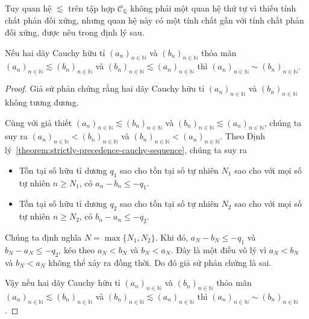 Tuy quan hệ $\lesssim$ trên tập hợp $\mathscr{C}_{\mathbb{Q}}$ không phải một quan hệ thứ tự vì thiếu tính chất phản đối xứng, nhưng quan hệ này có một tính chất gần với tính chất phản đối xứng, được nêu trong định lý sau.

\begin{theorem}\label{theorem:cauchy-sequences-pre-antisymmetric}
    Nếu hai dãy Cauchy hữu tỉ ${(a_{n})}_{n\in\mathbb{N}}$ và ${(b_{n})}_{n\in\mathbb{N}}$ thỏa mãn ${(a_{n})}_{n\in\mathbb{N}}\lesssim {(b_{n})}_{n\in\mathbb{N}}$ và ${(b_{n})}_{n\in\mathbb{N}}\lesssim {(a_{n})}_{n\in\mathbb{N}}$ thì ${(a_{n})}_{n\in\mathbb{N}}\sim {(b_{n})}_{n\in\mathbb{N}}$.
\end{theorem}

\begin{proof}
    Giả sử phản chứng rằng hai dãy Cauchy hữu tỉ ${(a_{n})}_{n\in\mathbb{N}}$ và ${(b_{n})}_{n\in\mathbb{N}}$ không tương đương.

    Cùng với giả thiết ${(a_{n})}_{n\in\mathbb{N}}\lesssim {(b_{n})}_{n\in\mathbb{N}}$ và ${(b_{n})}_{n\in\mathbb{N}}\lesssim {(a_{n})}_{n\in\mathbb{N}}$, chúng ta suy ra  ${(a_{n})}_{n\in\mathbb{N}} < {(b_{n})}_{n\in\mathbb{N}}$ và ${(b_{n})}_{n\in\mathbb{N}} < {(a_{n})}_{n\in\mathbb{N}}$. Theo Định lý~\ref{theorem:strictly-precedence-cauchy-sequence}, chúng ta suy ra
    \begin{itemize}
        \item Tồn tại số hữu tỉ dương $q_{1}$ sao cho tồn tại số tự nhiên $N_{1}$ sao cho với mọi số tự nhiên $n\geq N_{1}$, có $a_{n} - b_{n}\leq -q_{1}$.
        \item Tồn tại số hữu tỉ dương $q_{2}$ sao cho tồn tại số tự nhiên $N_{2}$ sao cho với mọi số tự nhiên $n\geq N_{2}$, có $b_{n} - a_{n}\leq -q_{2}$.
    \end{itemize}

    Chúng ta định nghĩa $N = \max\{ N_{1}, N_{2} \}$. Khi đó, $a_{N} - b_{N}\leq -q_{1}$ và $b_{N} - a_{N}\leq -q_{2}$, kéo theo $a_{N} < b_{N}$ và $b_{N} < a_{N}$. Đây là một điều vô lý vì $a_{N} < b_{N}$ và $b_{N} < a_{N}$ không thể xảy ra đồng thời. Do đó giả sử phản chứng là sai.

    Vậy nếu hai dãy Cauchy hữu tỉ ${(a_{n})}_{n\in\mathbb{N}}$ và ${(b_{n})}_{n\in\mathbb{N}}$ thỏa mãn ${(a_{n})}_{n\in\mathbb{N}}\lesssim {(b_{n})}_{n\in\mathbb{N}}$ và ${(b_{n})}_{n\in\mathbb{N}}\lesssim {(a_{n})}_{n\in\mathbb{N}}$ thì ${(a_{n})}_{n\in\mathbb{N}}\sim {(b_{n})}_{n\in\mathbb{N}}$.
\end{proof}


